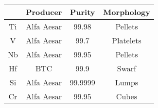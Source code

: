 \begin{tabular}{cccc}
\toprule
{} &    Producer &   Purity & Morphology \\
\midrule
Ti &  Alfa Aesar &    99.98 &    Pellets \\
V  &  Alfa Aesar &     99.7 &  Platelets \\
Nb &  Alfa Aesar &    99.95 &    Pellets \\
Hf &         BTC &     99.9 &      Swarf \\
Si &  Alfa Aesar &  99.9999 &      Lumps \\
Cr &  Alfa Aesar &    99.95 &      Cubes \\
\bottomrule
\end{tabular}
